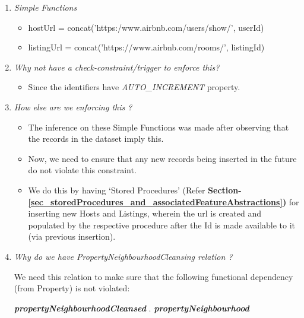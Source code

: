 \documentclass[conference]{IEEEtran}
\begin{document}
        \begin{enumerate}
            \item \textit{Simple Functions}
                \begin{itemize}
                    \item {\small hostUrl = concat('https:/www.airbnb.com/users/show/', userId)}
                    \item {\small listingUrl = concat('https://www.airbnb.com/rooms/', listingId)}
                \end{itemize}
    
            \vspace{1mm}
    
             \item \textit{Why not have a check-constraint/trigger to enforce this?}
                \begin{itemize}
                    \item {\small Since the identifiers have \textit{AUTO\_INCREMENT} property.}
                \end{itemize}
    
    	\vspace{1mm}
    
             \item \textit{How else are we enforcing this ?}
                \begin{itemize}
                    \item The inference on these Simple Functions was made after observing that the records in the dataset imply this.
                    \item Now, we need to ensure that any new records being inserted in the future do not violate this constraint.
                    \item We do this by having ‘Stored Procedures’ (Refer \textbf{Section-\ref{sec_storedProcedures_and_associatedFeatureAbstractions})} for inserting new Hosts and Listings, wherein the url is created and populated by the respective procedure after the Id is made available to it (via previous insertion).
                \end{itemize}

	\vspace{1mm}

	\item \textit{Why do we have PropertyNeighbourhoodCleansing relation ?}
 
                We need this relation to make sure that the following functional dependency (from Property) is not violated:
                
                 { 
                    \begin{center}
                        \footnotesize \textbf{\textit{propertyNeighbourhoodCleansed}  \textrightarrow} . \textbf{\textit{propertyNeighbourhood}}
                    \end{center}
                 }

	\vspace{1mm}

        \end{enumerate}
\end{document}
